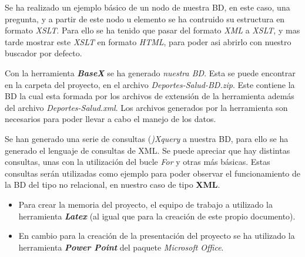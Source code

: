 \documentclass[idxtotoc,hyperref,openany]{labbook} %
\begin{document}
Se ha realizado un ejemplo básico de un nodo de nuestra BD, en este caso, una pregunta, y a partir de este nodo u elemento se ha contruido su estructura en formato \textit{XSLT}.
Para ello se ha tenido que pasar del formato \textit{XML} a \textit{XSLT}, y mas tarde mostrar este \textit{XSLT} en formato \textit{HTML}, para poder asi abrirlo con nuestro buscador por defecto.


Con la herramienta \textit{\textbf{BaseX}} se ha generado \textit{nuestra BD}. Esta se puede encontrar en la carpeta del proyecto, en el archivo \textit{Deportes-Salud-BD.zip}. Este contiene la BD la cual esta formada por los archivos de extensión de la herramienta además del archivo \textit{Deportes-Salud.xml}. Los archivos generados por la herramienta son necesarios para poder llevar a cabo el manejo de los datos.


Se han generado una serie de consultas (\textit{)Xquery} a nuestra BD, para ello se ha generado el lenguaje de consultas de XML. Se puede apreciar que hay distintas consultas, unas con la utilización del bucle \textit{For} y otras más básicas. Estas consultas serán utilizadas como ejemplo para poder observar el funcionamiento de la BD del tipo no relacional, en nuestro caso de tipo \textbf{XML}.


\begin{itemize}
	\item Para crear la memoria del proyecto, el equipo de trabajo a utilizado la herramienta \textit{\textbf{Latex}} (al igual que para la creación de este propio documento).
	
	\item  En cambio para la creación de la presentación del proyecto se ha utilizado la herramienta \textbf{\textit{Power Point}} del paquete \textit{Microsoft Office}.
	
\end{itemize}




\end{document}
